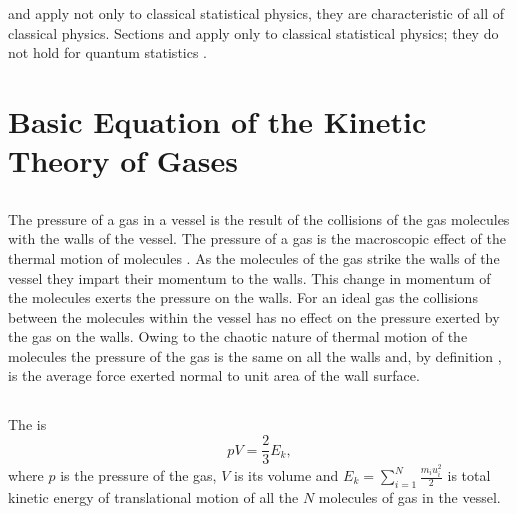  and  apply not only to classical statistical physics, they are characteristic of all of classical physics. Sections  and  apply only to classical statistical physics; they do not hold for quantum statistics .

\section[Basic Equation]{Basic Equation of the Kinetic Theory of Gases}
\label{sec-10.2}


\subsection{}\label{10.2.1} The pressure of a gas  in a vessel is the result of the collisions of the gas molecules with the walls of the vessel. The pressure of a gas is the macroscopic effect of the thermal motion of molecules . As the molecules of the gas strike the walls of the vessel  they impart their momentum  to the walls. This change in momentum of the molecules exerts the pressure on the walls. For an ideal gas the collisions between the molecules within the vessel has no effect on the pressure exerted by the gas on the walls. Owing to the chaotic nature of thermal motion of the molecules  the pressure of the gas is the same on all the walls and, by definition , is the average force exerted normal to unit area of the wall surface.

\subsection{}\label{10.2.2} The  is 
\begin{equation*}%
pV = \frac{2}{3} E_{k},
\end{equation*}
where $p$ is the pressure of the gas, $V$ is its volume and $E_{k} = \sum_{i=1}^{N}
\frac{m_{i}u_{i}^{2}}{2}$ is total kinetic energy of translational motion of all the $N$ molecules of gas in the vessel.


